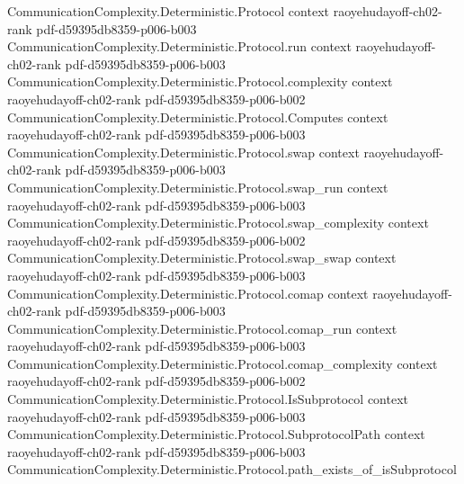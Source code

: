 \begin{theorem}
\label{CommunicationComplexity.Deterministic.Rank.boolFunctionRank_le_pow_of_communicationComplexity_le}
\leanok
{}
\proofstep
  {CommunicationComplexity.Deterministic.Protocol}
  {context}
  {raoyehudayoff-ch02-rank}
  {pdf-d59395db8359-p006-b003}
\proofstep
  {CommunicationComplexity.Deterministic.Protocol.run}
  {context}
  {raoyehudayoff-ch02-rank}
  {pdf-d59395db8359-p006-b003}
\proofstep
  {CommunicationComplexity.Deterministic.Protocol.complexity}
  {context}
  {raoyehudayoff-ch02-rank}
  {pdf-d59395db8359-p006-b002}
\proofstep
  {CommunicationComplexity.Deterministic.Protocol.Computes}
  {context}
  {raoyehudayoff-ch02-rank}
  {pdf-d59395db8359-p006-b003}
\proofstep
  {CommunicationComplexity.Deterministic.Protocol.swap}
  {context}
  {raoyehudayoff-ch02-rank}
  {pdf-d59395db8359-p006-b003}
\proofstep
  {CommunicationComplexity.Deterministic.Protocol.swap_run}
  {context}
  {raoyehudayoff-ch02-rank}
  {pdf-d59395db8359-p006-b003}
\proofstep
  {CommunicationComplexity.Deterministic.Protocol.swap_complexity}
  {context}
  {raoyehudayoff-ch02-rank}
  {pdf-d59395db8359-p006-b002}
\proofstep
  {CommunicationComplexity.Deterministic.Protocol.swap_swap}
  {context}
  {raoyehudayoff-ch02-rank}
  {pdf-d59395db8359-p006-b003}
\proofstep
  {CommunicationComplexity.Deterministic.Protocol.comap}
  {context}
  {raoyehudayoff-ch02-rank}
  {pdf-d59395db8359-p006-b003}
\proofstep
  {CommunicationComplexity.Deterministic.Protocol.comap_run}
  {context}
  {raoyehudayoff-ch02-rank}
  {pdf-d59395db8359-p006-b003}
\proofstep
  {CommunicationComplexity.Deterministic.Protocol.comap_complexity}
  {context}
  {raoyehudayoff-ch02-rank}
  {pdf-d59395db8359-p006-b002}
\proofstep
  {CommunicationComplexity.Deterministic.Protocol.IsSubprotocol}
  {context}
  {raoyehudayoff-ch02-rank}
  {pdf-d59395db8359-p006-b003}
\proofstep
  {CommunicationComplexity.Deterministic.Protocol.SubprotocolPath}
  {context}
  {raoyehudayoff-ch02-rank}
  {pdf-d59395db8359-p006-b003}
\proofstep
  {CommunicationComplexity.Deterministic.Protocol.path_exists_of_isSubprotocol}

\end{theorem}
